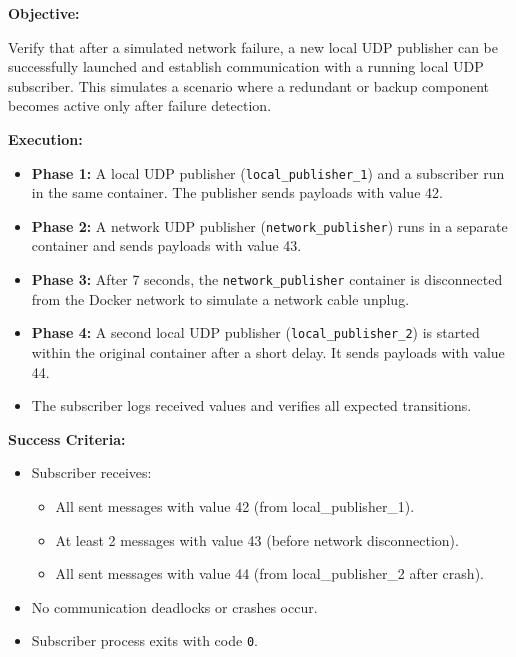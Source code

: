 \textbf{Objective:}

\vspace{0.4em}
Verify that after a simulated network failure, a new local UDP publisher can be successfully launched and establish communication with a running local UDP subscriber. This simulates a scenario where a redundant or backup component becomes active only after failure detection.

\vspace{0.5em}
\textbf{Execution:}
\begin{itemize}
	\item \textbf{Phase 1:} A local UDP publisher (\texttt{local\_publisher\_1}) and a subscriber run in the same container. The publisher sends payloads with value 42.
	\item \textbf{Phase 2:} A network UDP publisher (\texttt{network\_publisher}) runs in a separate container and sends payloads with value 43.
	\item \textbf{Phase 3:} After 7 seconds, the \texttt{network\_publisher} container is disconnected from the Docker network to simulate a network cable unplug.
	\item \textbf{Phase 4:} A second local UDP publisher (\texttt{local\_publisher\_2}) is started within the original container after a short delay. It sends payloads with value 44.
	\item The subscriber logs received values and verifies all expected transitions.
\end{itemize}

\vspace{0.4em}
\textbf{Success Criteria:}
\begin{itemize}
	\item Subscriber receives:
	\begin{itemize}
		\item All sent messages with value 42 (from local\_publisher\_1).
		\item At least 2 messages with value 43 (before network disconnection).
		\item All sent messages with value 44 (from local\_publisher\_2 after crash).
	\end{itemize}
	\item No communication deadlocks or crashes occur.
	\item Subscriber process exits with code \texttt{0}.
\end{itemize}

